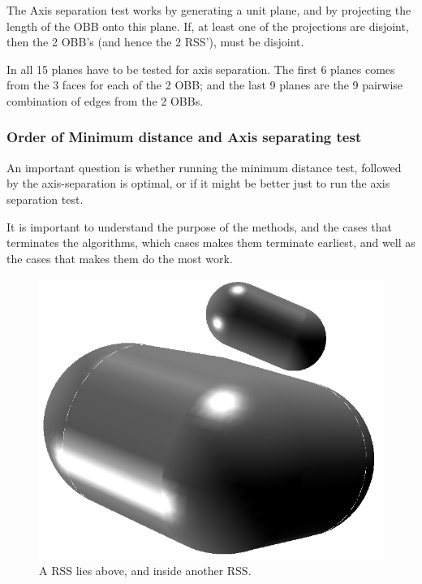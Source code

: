 The Axis separation test works by generating a unit plane, and by projecting the length of the OBB onto this plane. If, at least one of the projections are disjoint, then the 2 OBB's (and hence the 2 RSS'), must be disjoint.

In all 15 planes have to be tested for axis separation. The first 6 planes comes from the 3 faces for each of the 2 OBB; and the last 9 planes are the 9 pairwise combination of edges from the 2 OBBs. 

\subsubsection{Order of Minimum distance and Axis separating test}
\label{minAxisOrder}
An important question is whether running the minimum distance test, followed by the axis-separation is optimal, or if it might be better just to run the axis separation test.

It is important to understand the purpose of the methods, and the cases that terminates the algorithms, which cases makes them terminate earliest, and well as the cases that makes them do the most work.

\begin{figure}
\centering
\includegraphics[width=\textwidth]{figures/sepAxis}
\caption{\label{parallel} A RSS lies above, and inside another RSS.}
\end{figure}

